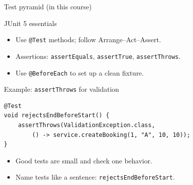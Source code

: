 \documentclass{beamer}
\begin{document}
\begin{frame}{Test pyramid (in this course)}
  \centering
  \slidesources{\OOPSUnitVISources}
\end{frame}

\begin{frame}{JUnit 5 essentials}
  \begin{itemize}[<+->]
    \item Use \texttt{@Test} methods; follow Arrange--Act--Assert.
    \item Assertions: \texttt{assertEquals}, \texttt{assertTrue}, \texttt{assertThrows}.
    \item Use \texttt{@BeforeEach} to set up a clean fixture.
  \end{itemize}
  \slidesources{\OOPSUnitVISources}
\end{frame}

\begin{frame}[fragile]{Example: \texttt{assertThrows} for validation}
\begin{lstlisting}
@Test
void rejectsEndBeforeStart() {
    assertThrows(ValidationException.class,
        () -> service.createBooking(1, "A", 10, 10));
}
\end{lstlisting}
  \begin{itemize}[<+->]
    \item Good tests are small and check one behavior.
    \item Name tests like a sentence: \texttt{rejectsEndBeforeStart}.
  \end{itemize}
  \slidesources{\OOPSUnitVISources}
\end{frame}
\end{document}

